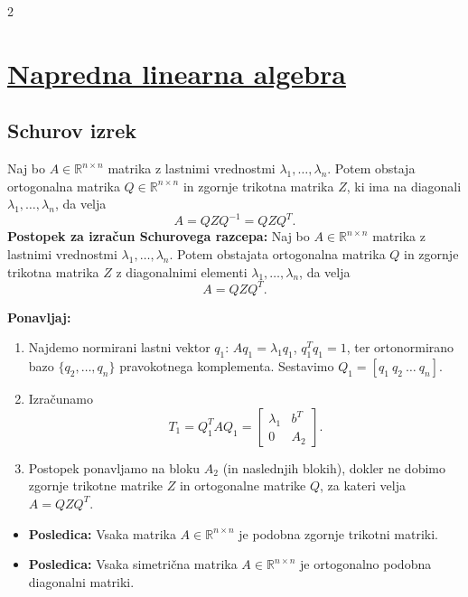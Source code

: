 \documentclass{article}
\begin{document}
\begin{multicols}{2}
	\section{\underline{Napredna linearna algebra}}

	\subsection{Schurov izrek}

	Naj bo \( A \in \mathbb{R}^{n \times n} \) matrika z lastnimi vrednostmi \( \lambda_1, \ldots, \lambda_n \). Potem obstaja ortogonalna matrika \( Q \in \mathbb{R}^{n \times n} \) in zgornje trikotna matrika \( Z \), ki ima na diagonali \( \lambda_1, \ldots, \lambda_n \), da velja
	\[ A = QZQ^{-1} = QZQ^T. \]
	\textbf{Postopek za izračun Schurovega razcepa:}
	Naj bo \(A \in \mathbb{R}^{n \times n}\) matrika z lastnimi
	vrednostmi \(\lambda_1, \ldots, \lambda_n\). Potem obstajata ortogonalna matrika
	\(Q\) in zgornje trikotna matrika \(Z\) z diagonalnimi elementi
	\(\lambda_1, \ldots, \lambda_n\), da velja
	\[
		A = Q Z Q^{T}.
	\]

	\textbf{Ponavljaj:}
	\begin{enumerate}
		\item Najdemo normirani lastni vektor \(q_1\):
		      \(Aq_1 = \lambda_1 q_1\), \(q_1^{T}q_1 = 1\), ter ortonormirano
		      bazo \(\{q_2,\ldots,q_n\}\) pravokotnega komplementa.
		      Sestavimo \(Q_1 = [q_1 \ q_2 \ \dots \ q_n]\).
		\item Izračunamo
		      \[
			      T_1 = Q_1^{T} A Q_1 =
			      \begin{bmatrix}
				      \lambda_1 & b^{T} \\
				      0         & A_2
			      \end{bmatrix}.
		      \]
		\item Postopek ponavljamo na bloku \(A_2\) (in naslednjih blokih), dokler
		      ne dobimo zgornje trikotne matrike \(Z\) in ortogonalne matrike \(Q\),
		      za kateri velja \(A = Q Z Q^{T}\).
	\end{enumerate}


	\begin{itemize}
		\item \textbf{Posledica:} Vsaka matrika \( A \in \mathbb{R}^{n \times n} \) je podobna zgornje trikotni matriki.

		\item \textbf{Posledica:} Vsaka simetrična matrika \( A \in \mathbb{R}^{n \times n} \) je ortogonalno podobna diagonalni matriki.


\end{itemize}
\end{multicols}
\end{document}
